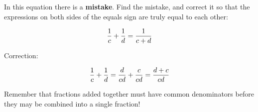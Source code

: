 

In this equation there is a {\bf mistake}.  Find the mistake, and correct it so that the expressions on both sides of the equals sign are truly equal to each other:

$${1 \over c} + {1 \over d} = {1 \over {c + d}}$$







Correction:

$${1 \over c} + {1 \over d} = {d \over cd} + {c \over cd} = {{d + c} \over cd}$$







Remember that fractions added together must have common denominators before they may be combined into a single fraction!




